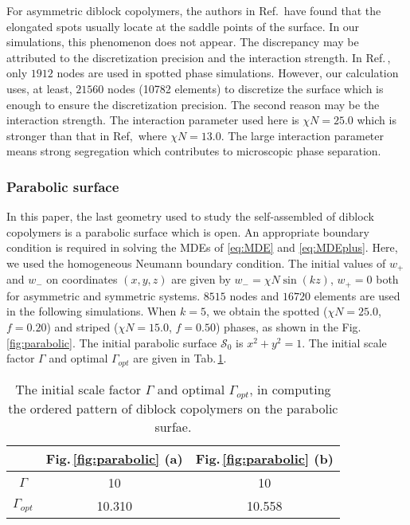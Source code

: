 \documentclass[final,1p,times]{elsarticle}
\newcommand{\calS}{\mathcal{S}}
\begin{document}
For asymmetric diblock copolymers, the authors in Ref.\,\cite{li2014self} have
found that the elongated spots usually locate at the saddle points of the
surface.  In our simulations, this phenomenon does not appear.  The discrepancy
may be attributed to the discretization precision and the interaction strength.
In Ref.\,\cite{li2014self}, only $1912$ nodes are used in spotted phase
simulations.  However, our calculation uses, at least, $21560$ nodes (10782
elements) to discretize the surface which is enough to ensure the
discretization precision. The second reason may be the interaction strength.
The interaction parameter used here is $\chi N=25.0$ which is stronger than
that in Ref,\,\cite{li2014self} where $\chi N =13.0$.  The large interaction
parameter means strong segregation which contributes to microscopic phase
separation.  



\subsubsection{Parabolic surface }
\label{subsubsec:parabolic}

In this paper, the last geometry used to study the self-assembled of diblock
copolymers is a parabolic surface which is open.  An appropriate
boundary condition is required in solving the MDEs of
\eqref{eq:MDE} and \eqref{eq:MDEplus}. Here, we used the homogeneous Neumann
boundary condition.  The initial values of $w_+$ and $w_-$ on coordinates $(x,
y, z)$ are given by $w_- = \chi N \sin(k z)$, $w_+=0$ both for asymmetric and
symmetric systems.  $8515$ nodes and $16720$ elements are used in the
following simulations. When $k=5$, we obtain the spotted ($\chi N=25.0$,
$f=0.20$) and striped ($\chi N=15.0$, $f=0.50$) phases, as shown in the
Fig.\,\ref{fig:parabolic}.  The initial parabolic surface $\calS_0$ is $x^2+y^2
= 1$.  The initial scale factor $\Gamma$ and optimal $\Gamma_{opt}$ are given
in Tab.\,\ref{tab:parabolic}. 

\begin{table}[!htpb]
    \caption {The initial scale factor $\Gamma$ and optimal $\Gamma_{opt}$,
    in computing the ordered pattern of diblock copolymers on the
	parabolic surfae.}
  \label{tab:parabolic}
  \centering
\begin{tabular}{|c|c|c|}
 \hline
    & Fig.\,\ref{fig:parabolic} (a) & Fig.\,\ref{fig:parabolic} (b) 
 \\ \hline
    $\Gamma$ & 10 & 10 
    \\ \hline
    $\Gamma_{opt}$ & 10.310 & 10.558
    \\ \hline
\end{tabular}
\end{table}
\end{document}
